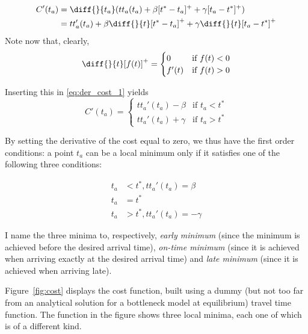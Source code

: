 \begin{equation}
  \label{eq:der_cost_1}
  \begin{split}
    C'(t_a) & = \diff{}{t_a}(tt_a(t_a) + \beta [t^* - t_a]^+ + \gamma [t_a - t^*]^+) \\
            & = tt_a'(t_a) + \beta \diff{}{t}[t^* - t_a]^+ + \gamma \diff{}{t} [t_a - t^*]^+
  \end{split}
\end{equation}
Note now that, clearly,
\begin{equation*}
  \diff{}{t}[f(t)]^+ =
  \begin{cases}
    0 & \text{if } f(t) < 0 \\
    f'(t) & \text{if } f(t) > 0
  \end{cases}
\end{equation*}

Inserting this in \eqref{eq:der_cost_1} yields
\begin{equation}
  \label{eq:der_cost_2}
  C'(t_a) =
  \begin{cases}
    tt_a'(t_a) - \beta & \text{if } t_a < t^* \\
    tt_a'(t_a) + \gamma & \text{if } t_a > t^*
  \end{cases}
\end{equation}

By setting the derivative of the cost equal to zero,
we thus have the first order conditions:
a point \(t_a\) can be a local minimum only if it satisfies one of the following three conditions:

\begin{equation}
  \label{eq:three_minima}
  \begin{split}
    t_a & < t^*, tt_a'(t_a) = \beta \\
    t_a & = t^* \\
    t_a & > t^*, tt_a'(t_a) = -\gamma
  \end{split}
\end{equation}

I name the three minima to, respectively,
\textit{early minimum} (since the minimum is achieved before the desired arrival time),
\textit{on-time minimum} (since it is achieved when arriving exactly at the desired arrival time)
and \textit{late minimum} (since it is achieved when arriving late).

Figure~\ref{fig:cost} displays the cost function, built using a dummy
(but not too far from an analytical solution for a bottleneck model at equilibrium)
travel time function.
The function in the figure shows three local minima, each one of which is of a different kind.

